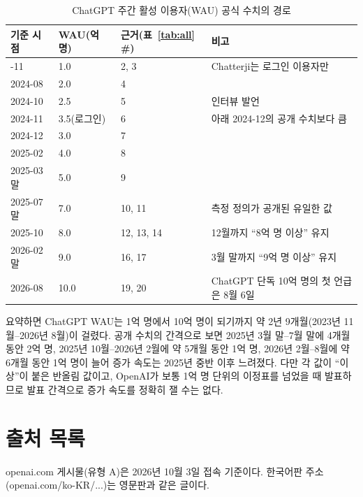 \documentclass[11pt]{article}
\begin{document}
{\small
\begin{longtable}{@{}L{2.4cm} L{2.4cm} L{2.6cm} L{8.2cm}@{}}
\caption{ChatGPT 주간 활성 이용자(WAU) 공식 수치의 경로}\label{tab:path}\\
\toprule
기준 시점 & WAU(억 명) & 근거(표~\ref{tab:all} \#) & 비고 \\
\midrule
\endhead
\bottomrule
{}-11 & 1.0 & 2, 3 & Chatterji는 로그인 이용자만 \\
2024-08 & 2.0 & 4 & \\
2024-10 & 2.5 & 5 & 인터뷰 발언 \\
2024-11 & 3.5(로그인) & 6 & 아래 2024-12의 공개 수치보다 큼 \\
2024-12 & 3.0 & 7 & \\
2025-02 & 4.0 & 8 & \\
2025-03 말 & 5.0 & 9 & \\
2025-07 말 & 7.0 & 10, 11 & 측정 정의가 공개된 유일한 값 \\
2025-10 & 8.0 & 12, 13, 14 & 12월까지 ``8억 명 이상'' 유지 \\
2026-02 말 & 9.0 & 16, 17 & 3월 말까지 ``9억 명 이상'' 유지 \\
2026-08 & 10.0 & 19, 20 & ChatGPT 단독 10억 명의 첫 언급은 8월 6일 \\
\end{longtable}
}

요약하면 ChatGPT WAU는 1억 명에서 10억 명이 되기까지 약 2년 9개월(2023년 11월--2026년 8월)이 걸렸다. 공개 수치의 간격으로 보면 2025년 3월 말--7월 말에 4개월 동안 2억 명, 2025년 10월--2026년 2월에 약 5개월 동안 1억 명, 2026년 2월--8월에 약 6개월 동안 1억 명이 늘어 증가 속도는 2025년 중반 이후 느려졌다. 다만 각 값이 ``이상''이 붙은 반올림 값이고, OpenAI가 보통 1억 명 단위의 이정표를 넘었을 때 발표하므로 발표 간격으로 증가 속도를 정확히 잴 수는 없다.

\section{출처 목록}\label{sec:sources}

openai.com 게시물(유형 A)은 2026년 10월 3일 접속 기준이다. 한국어판 주소(openai.com/ko-KR/...)는 영문판과 같은 글이다.
\end{document}
